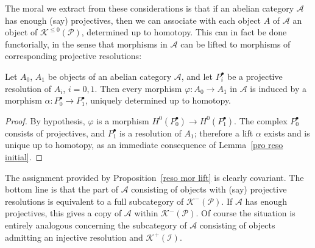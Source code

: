 The moral we extract from these considerations is that if an abelian category $\mathcal{A}$ has enough (say) projectives, then we can associate with each object $A$ of $\mathcal{A}$ an object of $\mathcal{K}^{\leq0}(\mathcal{P})$, determined up to homotopy. This can in fact be done functorially,
in the sense that morphisms in $\mathcal{A}$ can be lifted to morphisms of corresponding projective resolutions:
\begin{proposition}\label{reso mor lift}
Let $A_0$, $A_1$ be objects of an abelian category $\mathcal{A}$, and let $P_i^\bullet$ be
a projective resolution of $A_i$, $i=0,1$. Then every morphism $\varphi:A_0\to A_1$ in $\mathcal{A}$ is
induced by a morphism $\alpha:P_0^\bullet\to P_1^\bullet$, uniquely determined up to homotopy.
\end{proposition}
\begin{proof}
By hypothesis, $\varphi$ is a morphism $H^0(P_0^\bullet)\to H^0(P_1^\bullet)$. The complex $P_0^\bullet$ consists of projectives, and $P_1^\bullet$ is a resolution of $A_1$; therefore a lift $\alpha$ exists and is unique up to homotopy, as an immediate consequence of Lemma~\ref{pro reso initial}.
\end{proof}
The assignment provided by Proposition~\ref{reso mor lift} is clearly covariant. The bottom line is that the part of $\mathcal{A}$ consisting of objects with (say) projective resolutions is equivalent to a full subcategory of $\mathcal{K}^{-}(\mathcal{P})$. If $\mathcal{A}$ has enough projectives, this gives a copy of $\mathcal{A}$ within $\mathcal{K}^-(\mathcal{P})$.
Of course the situation is entirely analogous concerning the subcategory of $\mathcal{A}$ consisting of objects admitting an injective resolution and 
$\mathcal{K}^+(\mathcal{I})$.
